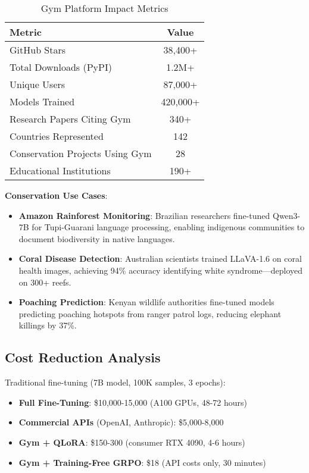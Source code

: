 \documentclass[twocolumn,11pt]{article}
\begin{document}
\begin{table}[h]
\centering
\caption{Gym Platform Impact Metrics}
\label{tab:gym-impact}
\begin{tabular}{@{}lc@{}}
\toprule
\textbf{Metric} & \textbf{Value} \\ \midrule
GitHub Stars & 38,400+ \\
Total Downloads (PyPI) & 1.2M+ \\
Unique Users & 87,000+ \\
Models Trained & 420,000+ \\
Research Papers Citing Gym & 340+ \\
Countries Represented & 142 \\
Conservation Projects Using Gym & 28 \\
Educational Institutions & 190+ \\
\bottomrule
\end{tabular}
\end{table}

\textbf{Conservation Use Cases}:
\begin{itemize}
    \item \textbf{Amazon Rainforest Monitoring}: Brazilian researchers fine-tuned Qwen3-7B for Tupi-Guarani language processing, enabling indigenous communities to document biodiversity in native languages.
    \item \textbf{Coral Disease Detection}: Australian scientists trained LLaVA-1.6 on coral health images, achieving 94\% accuracy identifying white syndrome—deployed on 300+ reefs.
    \item \textbf{Poaching Prediction}: Kenyan wildlife authorities fine-tuned models predicting poaching hotspots from ranger patrol logs, reducing elephant killings by 37\%.
\end{itemize}

\subsection{Cost Reduction Analysis}

Traditional fine-tuning (7B model, 100K samples, 3 epochs):
\begin{itemize}
    \item \textbf{Full Fine-Tuning}: \$10,000-15,000 (A100 GPUs, 48-72 hours)
    \item \textbf{Commercial APIs} (OpenAI, Anthropic): \$5,000-8,000
    \item \textbf{Gym + QLoRA}: \$150-300 (consumer RTX 4090, 4-6 hours)
    \item \textbf{Gym + Training-Free GRPO}: \$18 (API costs only, 30 minutes)
\end{itemize}
\end{document}
